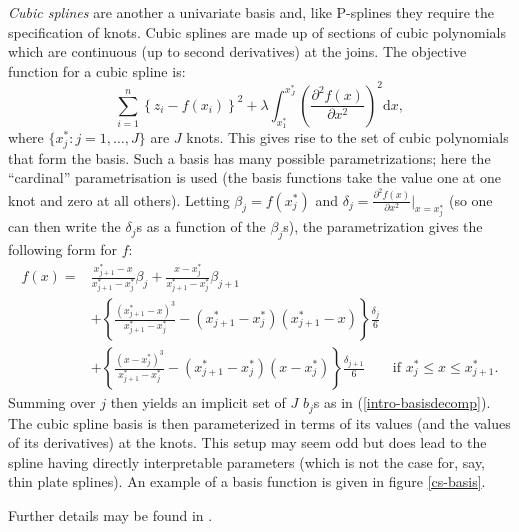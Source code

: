 \textit{Cubic splines} are another a univariate basis and, like P-splines they require the specification of knots. Cubic splines are made up of sections of cubic polynomials which are continuous (up to second derivatives) at the joins. The objective function for a cubic spline is:
\begin{equation*}
\sum_{i=1}^n \left \{ z_i - f(x_i) \right \}^2 +  \lambda \int_{x^*_1}^{x^*_J}\left( \frac{\partial^2 f(x)}{\partial x^2} \right)^2 \text{d}x,
\end{equation*}
where $\{x_j^* : j=1,\ldots,J\}$ are $J$ knots. This gives rise to the set of cubic polynomials that form the basis. Such a basis has many possible parametrizations; here the ``cardinal'' parametrisation is used (the basis functions take the value one at one knot and zero at all others). Letting $\beta_j = f(x_j^*)$ and $\delta_j = \frac{\partial^2 f(x)}{\partial x^2}\vert_{x=x_j^*}$ (so one can then write the $\delta_j$s as a function of the $\beta_j$s), the parametrization gives the following form for $f$:
\begin{align*}
f(x) =& \frac{x_{j+1}^* - x}{x_{j+1}^* - x_j^*} \beta_j + \frac{x - x_j^*}{x_{j+1}^* - x_j^*} \beta_{j+1}\\
& + \left\{ \frac{\left (x_{j+1}^* - x\right )^3}{x_{j+1}^* - x_j^*} - (x_{j+1}^* - x_j^*)(x_{j+1}^* - x)\right \}\frac{\delta_j}{6}\\
& + \left\{ \frac{\left (x - x_j^*\right )^3}{x_{j+1}^* - x_j^*} - (x_{j+1}^* - x_j^*)(x - x_j^*)\right \}\frac{\delta_{j+1}}{6} \qquad \text{if } x_j^* \leq x \leq x_{j+1}^*.
\end{align*}
Summing over $j$ then yields an implicit set of $J$ $b_j$s as in (\ref{intro-basisdecomp}). The cubic spline basis is then parameterized in terms of its values (and the values of its derivatives) at the knots. This setup may seem odd but does lead to the spline having directly interpretable parameters (which is not the case for, say, thin plate splines). An example of a basis function is given in figure \ref{cs-basis}.

Further details may be found in .

